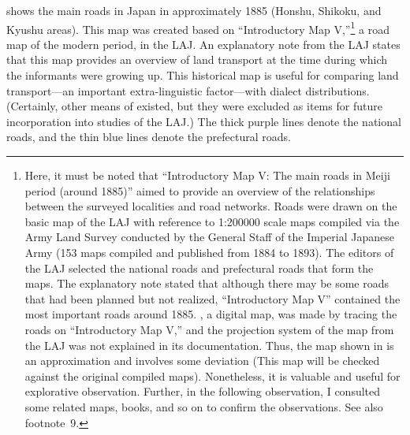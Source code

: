 \documentclass[output=paper]{LSP/langsci}
\begin{document}
 shows the main roads in Japan in approximately 1885 (Honshu, Shikoku, and Kyushu areas). This map was created based on “Introductory Map V,”\footnote{ Here, it must be noted that “Introductory Map V: The main roads in Meiji period (around 1885)” aimed to provide an overview of the relationships between the surveyed localities and road networks. Roads were drawn on the basic map of the LAJ with reference to 1:200000 scale maps compiled via the Army Land Survey conducted by the General Staff of the Imperial Japanese Army (153 maps compiled and published from 1884 to 1893). The editors of the LAJ selected the national roads and prefectural roads that form the maps. The explanatory note stated that although there may be some roads that had been planned but not realized, “Introductory Map V” contained the most important roads around 1885. , a digital map, was made by tracing the roads on “Introductory Map V,” and the projection system of the map from the LAJ was not explained in its documentation. Thus, the map shown in  is an approximation and involves some deviation (This map will be checked against the original compiled maps). Nonetheless, it is valuable and useful for explorative observation. Further, in the following observation, I consulted some related maps, books, and so on to confirm the observations. See also footnote~9.} a road map of the modern period, in the LAJ. An explanatory note from the LAJ states that this map provides an overview of land transport at the time during which the informants were growing up. This historical map is useful for comparing land transport—an important extra-linguistic factor—with dialect distributions. (Certainly, other means of  existed, but they were excluded as items for future incorporation into studies of the LAJ.) The thick purple lines denote the national roads, and the thin blue lines denote the prefectural roads.
\end{document}
